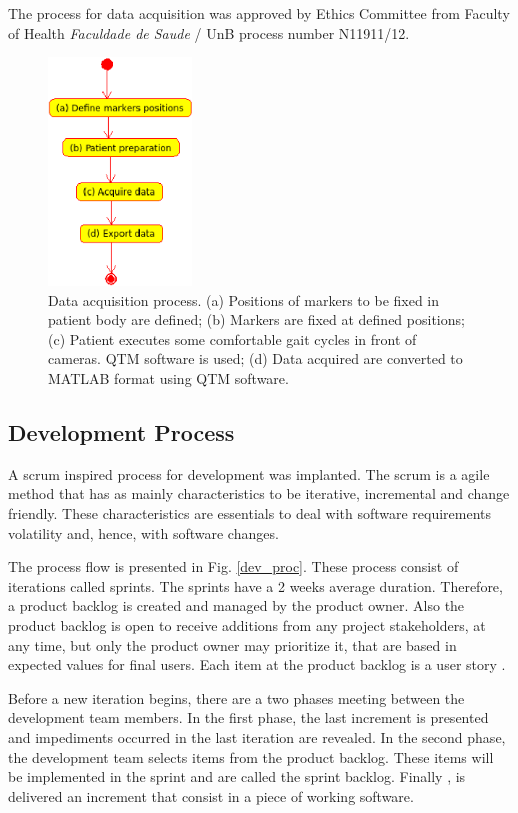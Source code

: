 \documentclass[journal]{IEEEtran}
\begin{document}
The process for data acquisition was approved by Ethics Committee from Faculty of Health 
\emph{Faculdade de Saude} / UnB  
process number N11911/12.

\begin{figure}[!t]
	\centering
	\includegraphics[width=1.5in]{./data_acq_proc.eps}
	\caption{Data acquisition process.
		(a) Positions of markers to be fixed in patient body are defined;
		(b) Markers are fixed at defined positions;
		(c) Patient executes some comfortable gait cycles in front of cameras.
		QTM software is used;
		(d) Data acquired are converted to MATLAB format using QTM software.
	}
	\label{data_acq_proc}
\end{figure}


\subsection{Development Process}

A scrum \cite{Schwaber2001, Schwaber2004, Rubin2012} inspired process for development was implanted.
The scrum is a agile method \cite{Beck2001} that has as mainly characteristics
to be iterative, incremental and change friendly.
These characteristics are essentials to deal with software requirements volatility
and, hence, with software changes.

The process flow is presented in Fig. \ref{dev_proc}.
These process consist of iterations called sprints.
The sprints have a 2 weeks average duration.
Therefore, a product backlog is created and managed by the product owner.
Also the product backlog is open to receive additions from any
project stakeholders, at any time, but only the product owner may prioritize it,
that are based in expected values for final users.
Each item at the product backlog is a user story \cite{cohn2004}.

Before a new iteration begins, there are a two phases meeting between the development team members. 
In the first phase, the last increment is presented and 
impediments occurred in the last iteration are revealed.
In the second phase, the development team selects items from the product backlog.
These items will be implemented in the sprint and are called the sprint backlog.
Finally , is delivered an increment that consist in a piece of working software.
\end{document}
